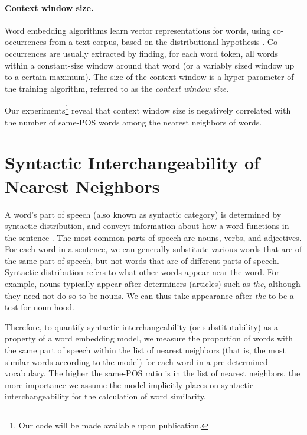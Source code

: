 \documentclass[11pt,a4paper]{article}
\begin{document}
    \paragraph{Context window size.}
    Word embedding algorithms learn vector representations for words,
    using co-occurrences from a text corpus,
    based on the distributional hypothesis \cite{harris1954distributional}.
    Co-occurrences are usually extracted by finding, for each word token, all
    words within a constant-size window around that word (or a variably sized
    window up to a certain maximum).
    The size of the context window is a hyper-parameter of the training algorithm,
    referred to as the \textit{context window size}.

    Our experiments\footnote{Our code will be made available upon publication.}
    reveal that context window size is negatively correlated
    with the number of same-POS words among the nearest neighbors of words.
    
    \section{Syntactic Interchangeability of Nearest Neighbors}\label{sec:nn}
    
    A word's part of speech (also known as syntactic category)
    is determined by syntactic distribution, and
    conveys information about how a word functions in the sentence \cite{carnie2002syntax}.
    The most common parts of speech are nouns, verbs, and adjectives.
    For each word in a sentence,
    we can generally substitute various words that are of the same part of speech,
    but not words that are of different parts of speech.
    Syntactic distribution refers to what other words appear
    near the word. For example, nouns typically appear after determiners (articles)
    such as \textit{the}, although they need not do so to be nouns. We can thus
    take appearance after \textit{the} to be a test for noun-hood.
    
    Therefore, to quantify syntactic interchangeability (or substitutability)
    as a property of a word embedding model,
    we measure the proportion of words with the same part of speech
    within the list of nearest neighbors
    (that is, the most similar words according to the model)
    for each word in a pre-determined vocabulary.
    The higher the same-POS ratio is in the list of nearest neighbors,
    the more importance we assume the model implicitly places on syntactic interchangeability
    for the calculation of word similarity.
    
\end{document}
